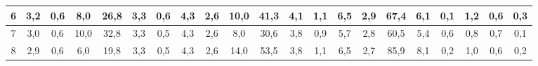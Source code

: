 \begin{sidewaystable}[]
\begin{tabular}{|c|c|c|c|c|c|c|c|c|c|c|c|c|c|c|c|c|c|c|c|c|}
    6  &  3,2                                              & 0,6                                              & 8,0                                              & 26,8                                             & 3,3                                              & 0,6                                              & 4,3                                              & 2,6                                              & 10,0                                             & 41,3                                             & 4,1                                              & 1,1                                              & 6,5                                              & 2,9                                              & 67,4                                             & 6,1                                              & 0,1                                              & 1,2                                              & 0,6                                              & 0,3                                              \\ \hline
    7  &  3,0                                              & 0,6                                              & 10,0                                             & 32,8                                             & 3,3                                              & 0,5                                              & 4,3                                              & 2,6                                              & 8,0                                              & 30,6                                             & 3,8                                              & 0,9                                              & 5,7                                              & 2,8                                              & 60,5                                             & 5,4                                              & 0,6                                              & 0,8                                              & 0,7                                              & 0,1                                              \\ \hline
    8  &  2,9                                              & 0,6                                              & 6,0                                              & 19,8                                             & 3,3                                              & 0,5                                              & 4,3                                              & 2,6                                              & 14,0                                             & 53,5                                             & 3,8                                              & 1,1                                              & 6,5                                              & 2,7                                              & 85,9                                             & 8,1                                              & 0,2                                              & 1,0                                              & 0,6                                              & 0,2                                              \\ \hline

\end{tabular}
\end{sidewaystable}
